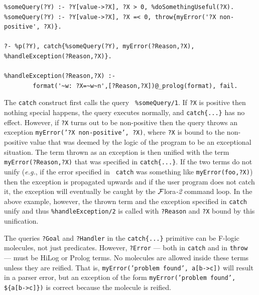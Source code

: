 \documentclass[11pt]{article}
\newcommand{\FLORA}{{\mbox{\sc ${\cal F}${lora}\rm\emph{-2}}}\xspace}
\newcommand{\fl}{\mbox{F-logic}\xspace}
\begin{document}
\begin{verbatim}
%someQuery(?Y) :- ?Y[value->?X], ?X > 0, %doSomethingUseful(?X).  
%someQuery(?Y) :- ?Y[value->?X], ?X =< 0, throw{myError('?X non-positive', ?X)}.

?- %p(?Y), catch{%someQuery(?Y), myError(?Reason,?X), %handleException(?Reason,?X)}.

%handleException(?Reason,?X) :-
        format('~w: ?X=~w~n',[?Reason,?X])@_prolog(format), fail.
\end{verbatim}
The {\tt catch} construct first calls the query {\tt
  \verb|%|someQuery/1}. If {\tt ?X} is positive then nothing special
  happens, the query executes normally, and {\tt catch\{...\}} has no
  effect.  However, if {\tt ?X} turns out to be non-positive then the
  query throws an exception {\tt myError('?X {\tt non-positive', ?X)}},
  where {\tt ?X} is bound to the non-positive value that was deemed by
  the logic of the program to be an exceptional situation.  The term
  thrown as an exception is then unified with the term {\tt
  myError(?Reason,?X)} that was specified in {\tt catch\{...\}}. If the
  two terms do not unify ({\it e.g.}, if the error specified in {\tt
  catch} was something like {\tt myError(foo,?X)}) then the exception is
  propagated upwards and if the user program does not catch it, the
  exception will eventually be caught by the \FLORA command loop. In the
  above example,
  however, the thrown term and the exception specified in
  {\tt catch} unify and thus {\tt \verb|%|handleException/2} is called
  with {\tt ?Reason} and {\tt ?X} bound by this unification.

The queries {\tt ?Goal} and {\tt ?Handler} in the {\tt catch\{...\}}
primitive can be \fl molecules, not just predicates. However, {\tt ?Error}
--- both in {\tt catch} and in {\tt throw} --- must be HiLog or Prolog
terms.  No molecules are allowed inside these terms unless they are
reified. That is, {\tt myError('problem found', a[b->c])} will result in a
parser error, but an exception of the form {\tt myError('problem found',
  \$\{a[b->c]\})} is correct because the molecule is reified.
\end{document}
